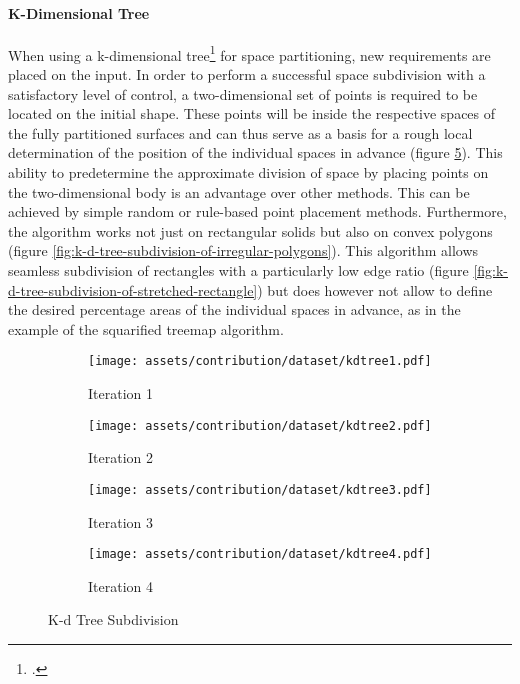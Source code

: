 \documentclass[a4paper, 12pt]{report}
\begin{document}
\paragraph{K-Dimensional Tree}\label{par:k-dimensional-tree}

When using a k-dimensional tree\footcites{knecht2010generating}{das2016space} for space partitioning, new requirements are placed on the input. In order to perform a successful space subdivision with a satisfactory level of control, a two-dimensional set of points is required to be located on the initial shape. These points will be inside the respective spaces of the fully partitioned surfaces and can thus serve as a basis for a rough local determination of the position of the individual spaces in advance (figure \ref{fig:k-d-tree-subdivision}). This ability to predetermine the approximate division of space by placing points on the two-dimensional body is an advantage over other methods. This can be achieved by simple random or rule-based point placement methods. Furthermore, the algorithm works not just on rectangular solids but also on \gls{convex} polygons (figure \ref{fig:k-d-tree-subdivision-of-irregular-polygons}). This algorithm allows seamless subdivision of rectangles with a particularly low edge ratio (figure \ref{fig:k-d-tree-subdivision-of-stretched-rectangle}) but does however not allow to define the desired percentage areas of the individual spaces in advance, as in the example of the squarified treemap algorithm.

\begin{figure}
\centering
\begin{subfigure}{.25\textwidth}
\centering
\texttt{[image: assets/contribution/dataset/kdtree1.pdf]}
\caption{Iteration 1}
\label{fig:iteration-2}
\end{subfigure}%
\begin{subfigure}{.25\textwidth}
\centering
\texttt{[image: assets/contribution/dataset/kdtree2.pdf]}
\caption{Iteration 2}
\label{fig:iteration-3}
\end{subfigure}%
\begin{subfigure}{.25\textwidth}
\centering
\texttt{[image: assets/contribution/dataset/kdtree3.pdf]}
\caption{Iteration 3}
\label{fig:iteration-4}
\end{subfigure}%
\begin{subfigure}{.25\textwidth}
\centering
\texttt{[image: assets/contribution/dataset/kdtree4.pdf]}
\caption{Iteration 4}
\label{fig:iteration-5}
\end{subfigure}
\caption{K-d Tree Subdivision}
\label{fig:k-d-tree-subdivision}
\end{figure}
\end{document}
